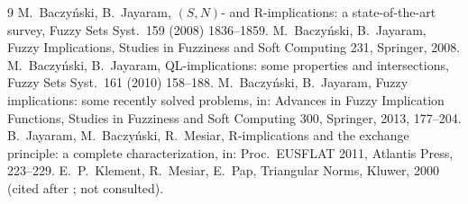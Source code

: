 \documentclass[11pt]{amsart}
\theoremstyle{remark}
\begin{document}
\begin{thebibliography}{9}
 M.~Baczy\'nski, B.~Jayaram, $(S,N)$- and R-implications: a
state-of-the-art survey, Fuzzy Sets Syst.\ 159 (2008) 1836--1859.
 M.~Baczy\'nski, B.~Jayaram, Fuzzy Implications,
Studies in Fuzziness and Soft Computing 231, Springer, 2008.
 M.~Baczy\'nski, B.~Jayaram, QL-implications: some
properties and intersections, Fuzzy Sets Syst.\ 161 (2010) 158--188.
 M.~Baczy\'nski, B.~Jayaram, Fuzzy implications: some
recently solved problems, in: Advances in Fuzzy Implication Functions, Studies
in Fuzziness and Soft Computing 300, Springer, 2013, 177--204.
 B.~Jayaram, M.~Baczy\'nski, R.~Mesiar, R-implications and
the exchange principle: a complete characterization, in: Proc.\ EUSFLAT 2011,
Atlantis Press, 223--229.
 E.~P.~Klement, R.~Mesiar, E.~Pap, Triangular Norms, Kluwer,
2000 (cited after \cite{JBM2011}; not consulted).
\end{thebibliography}
\end{document}
